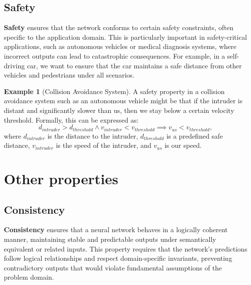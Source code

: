 \documentclass[oneside,11pt,dvipsnames]{book}
\numberwithin{equation}{section}
\theoremstyle{definition}
\newtheorem{example}{Example}[section]
\theoremstyle{remark}
\newcommand{\tvn}[1]{\iftoggle{usecomment}{{\color{red}{[TVN]: #1}}}{}}
\begin{document}


\subsection{Safety}


\textbf{Safety} ensures that the network conforms to certain safety constraints, often specific to the application domain. This is particularly important in safety-critical applications, such as autonomous vehicles or medical diagnosis systems, where incorrect outputs can lead to catastrophic consequences. For example, in a self-driving car, we want to ensure that the car maintains a safe distance from other vehicles and pedestrians under all scenarios.

\begin{example}[Collision Avoidance System]
    A safety property in a collision avoidance system such as an autonomous vehicle might be that if the intruder is distant and significantly slower than us, then we stay below a certain velocity threshold. Formally, this can be expressed as:
\[
d_{intruder} > d_{threshold} \land v_{intruder} < v_{threshold} \implies v_{us} < v_{threshold},
\]
where $d_{intruder}$ is the distance to the intruder, $d_{threshold}$ is a predefined safe distance, $v_{intruder}$ is the speed of the intruder, and $v_{us}$ is our speed.
\end{example}

\section{Other properties}\label{sec:other-properties}

\subsection{Consistency}

\textbf{Consistency} ensures that a neural network behaves in a logically coherent manner, maintaining stable and predictable outputs under semantically equivalent or related inputs. This property requires that the network's predictions follow logical relationships and respect domain-specific invariants, preventing contradictory outputs that would violate fundamental assumptions of the problem domain. 
\end{document}
